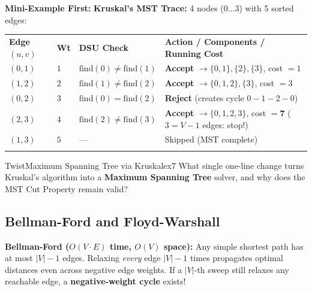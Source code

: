 \documentclass[11pt,a4paper]{article}
\theoremstyle{definition}
\newcommand{\examplebeat}{\textbf{\color{primaryblue}Mini-Example First:} }
\begin{document}
\examplebeat \textbf{Kruskal's MST Trace:} 4 nodes ($0 \dots 3$) with 5 sorted edges:
\begin{center}
\begingroup\footnotesize{}
\begin{tabularx}{\textwidth}{>{\centering\arraybackslash\bfseries}p{1.6cm} >{\centering\arraybackslash}p{1.2cm} >{\raggedright\arraybackslash}p{3.0cm} >{\raggedright\arraybackslash}X}
\arrayrulecolor{primaryblue}\toprule[1.1pt]
\rowcolor{primaryblue!10}
\textcolor{primaryblue}{\textbf{Edge $(u,v)$}} & \textcolor{primaryblue}{\textbf{Wt}} & \textcolor{primaryblue}{\textbf{DSU Check}} & \textcolor{primaryblue}{\textbf{Action / Components / Running Cost}} \\
\arrayrulecolor{codeframe}\midrule[0.6pt]
$(0, 1)$ & $1$ & $\text{find}(0) \neq \text{find}(1)$ & \textbf{Accept} $\to \{0,1\},\{2\},\{3\}$, cost $= 1$ \\
$(1, 2)$ & $2$ & $\text{find}(1) \neq \text{find}(2)$ & \textbf{Accept} $\to \{0,1,2\},\{3\}$, cost $= 3$ \\
$(0, 2)$ & $3$ & $\text{find}(0) = \text{find}(2)$ & \textbf{Reject} (creates cycle $0-1-2-0$) \\
$(2, 3)$ & $4$ & $\text{find}(2) \neq \text{find}(3)$ & \textbf{Accept} $\to \{0,1,2,3\}$, cost $= \mathbf{7}$ ($3 = V-1$ edges: stop!) \\
$(1, 3)$ & $5$ & --- & Skipped (MST complete) \\
\arrayrulecolor{primaryblue}\bottomrule[1.1pt]
\end{tabularx}\endgroup
\end{center}

\begin{tryitbox}{Twist}{Maximum Spanning Tree via Kruskal}{ex7}
What single one-line change turns Kruskal's algorithm into a \textbf{Maximum Spanning Tree} solver, and why does the MST Cut Property remain valid?
\end{tryitbox}

\subsection{Bellman-Ford and Floyd-Warshall}

\textbf{Bellman-Ford ($O(V \cdot E)$ time, $O(V)$ space):} Any simple shortest path has at most $|V| - 1$ edges. Relaxing \emph{every} edge $|V| - 1$ times propagates optimal distances even across negative edge weights. If a $|V|$-th sweep still relaxes any reachable edge, a \textbf{negative-weight cycle} exists!
\end{document}
